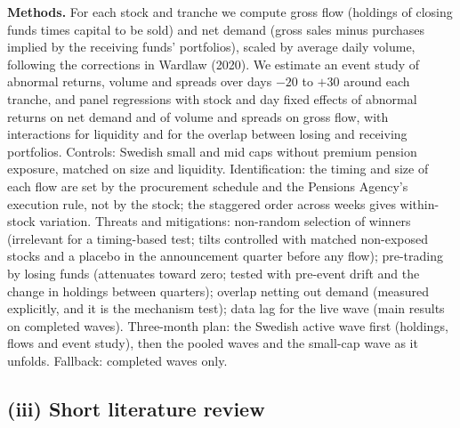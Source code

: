 \documentclass[12pt,a4paper]{article}
\begin{document}
\textbf{Methods.} For each stock and tranche we compute gross flow (holdings of closing funds times capital to be sold) and net demand (gross sales minus purchases implied by the receiving funds' portfolios), scaled by average daily volume, following the corrections in Wardlaw (2020). We estimate an event study of abnormal returns, volume and spreads over days $-20$ to $+30$ around each tranche, and panel regressions with stock and day fixed effects of abnormal returns on net demand and of volume and spreads on gross flow, with interactions for liquidity and for the overlap between losing and receiving portfolios. Controls: Swedish small and mid caps without premium pension exposure, matched on size and liquidity. Identification: the timing and size of each flow are set by the procurement schedule and the Pensions Agency's execution rule, not by the stock; the staggered order across weeks gives within-stock variation. Threats and mitigations: non-random selection of winners (irrelevant for a timing-based test; tilts controlled with matched non-exposed stocks and a placebo in the announcement quarter before any flow); pre-trading by losing funds (attenuates toward zero; tested with pre-event drift and the change in holdings between quarters); overlap netting out demand (measured explicitly, and it is the mechanism test); data lag for the live wave (main results on completed waves). Three-month plan: the Swedish active wave first (holdings, flows and event study), then the pooled waves and the small-cap wave as it unfolds. Fallback: completed waves only.

\subsection{(iii) Short literature review}
\end{document}
